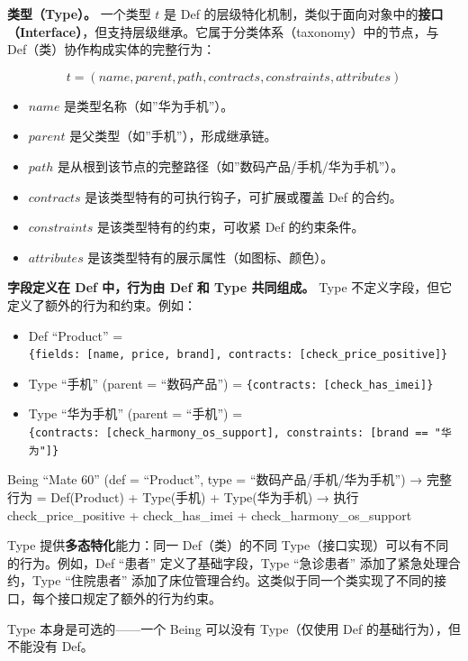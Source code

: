 \documentclass[11pt,a4paper]{ctexart}
\begin{document}
\textbf{类型（Type）。} 一个类型 \(t\) 是 Def
的层级特化机制，类似于面向对象中的\textbf{接口（Interface）}，但支持层级继承。它属于分类体系（taxonomy）中的节点，与
Def（类）协作构成实体的完整行为：

\[t = (name, parent, path, contracts, constraints, attributes)\]

\begin{itemize}
\tightlist
\item
  \(name\) 是类型名称（如''华为手机''）。
\item
  \(parent\) 是父类型（如''手机''），形成继承链。
\item
  \(path\) 是从根到该节点的完整路径（如''数码产品/手机/华为手机''）。
\item
  \(contracts\) 是该类型特有的可执行钩子，可扩展或覆盖 Def 的合约。
\item
  \(constraints\) 是该类型特有的约束，可收紧 Def 的约束条件。
\item
  \(attributes\) 是该类型特有的展示属性（如图标、颜色）。
\end{itemize}

\textbf{字段定义在 Def 中，行为由 Def 和 Type 共同组成。} Type
不定义字段，但它定义了额外的行为和约束。例如：

\begin{itemize}
\tightlist
\item
  Def ``Product'' =
  \texttt{\{fields:\ {[}name,\ price,\ brand{]},\ contracts:\ {[}check\_price\_positive{]}\}}
\item
  Type ``手机'' (parent = ``数码产品'') =
  \texttt{\{contracts:\ {[}check\_has\_imei{]}\}}
\item
  Type ``华为手机'' (parent = ``手机'') =
  \texttt{\{contracts:\ {[}check\_harmony\_os\_support{]},\ constraints:\ {[}brand\ ==\ "华为"{]}\}}
\end{itemize}

Being ``Mate 60'' (def = ``Product'', type = ``数码产品/手机/华为手机'')
→ 完整行为 = Def(Product) + Type(手机) + Type(华为手机) → 执行
check\_price\_positive + check\_has\_imei + check\_harmony\_os\_support

Type 提供\textbf{多态特化}能力：同一 Def（类）的不同
Type（接口实现）可以有不同的行为。例如，Def ``患者''
定义了基础字段，Type ``急诊患者'' 添加了紧急处理合约，Type ``住院患者''
添加了床位管理合约。这类似于同一个类实现了不同的接口，每个接口规定了额外的行为约束。

Type 本身是可选的------一个 Being 可以没有 Type（仅使用 Def
的基础行为），但不能没有 Def。
\end{document}
